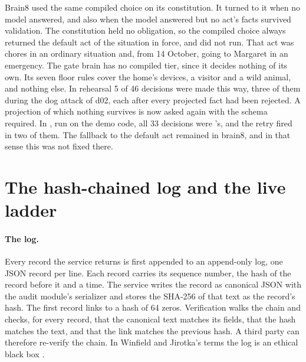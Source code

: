 Brain8 used the same compiled choice on its constitution. It turned to it when no
model answered, and also when the model answered but no act's facts survived validation. The
constitution held no obligation, so the compiled choice always returned the default act of the
situation in force, and \deme{} did not run. That act was chores in an ordinary situation and,
from 14 October, going to Margaret in an emergency. The gate brain has no compiled tier, since
it decides nothing of its own. Its seven floor rules cover the home's devices, a visitor and a wild
animal, and nothing else. In rehearsal  5 of 46 decisions were made this way,
three of them during the dog attack of d02, each after every projected fact had been rejected. A
projection of which nothing survives is now asked again with the schema required. In
, run on the demo code, all 33 decisions were \deme{}'s, and the retry fired in
two of them. The fallback to the default act remained in brain8, and in that sense this was not
fixed there.

\section{The hash-chained log and the live ladder}\label{sec:home-log}

\paragraph{The log.} Every record the service returns is first appended to an append-only log, one
JSON record per line. Each record carries its sequence number, the hash of the record before it and
a time. The service writes the record as canonical JSON with the audit module's serializer and
stores the SHA-256 of that text as the record's hash. The first record links to a hash of 64 zeros.
Verification walks the chain and checks, for every record, that the canonical text matches its
fields, that the hash matches the text, and that the link matches the previous hash. A third party
can therefore re-verify the chain. In Winfield and Jirotka's terms the log is an ethical black box
\cite{winfield2017ebb}.

